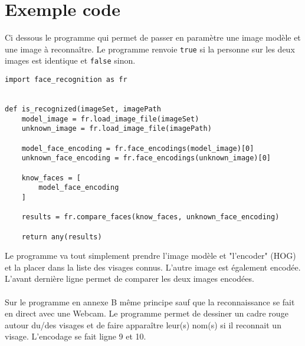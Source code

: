 \section{Exemple code}
Ci dessous le programme qui permet de passer en paramètre une image modèle et
une image à reconnaître. Le programme renvoie \verb|true| si la personne sur les deux
images est identique et \verb|false| sinon.
\\
\begin{verbatim}
import face_recognition as fr


def is_recognized(imageSet, imagePath
    model_image = fr.load_image_file(imageSet)
    unknown_image = fr.load_image_file(imagePath)

    model_face_encoding = fr.face_encodings(model_image)[0]
    unknown_face_encoding = fr.face_encodings(unknown_image)[0]

    know_faces = [
        model_face_encoding
    ]

    results = fr.compare_faces(know_faces, unknown_face_encoding)

    return any(results)
\end{verbatim}

Le programme va tout simplement prendre l'image modèle et "l'encoder" (HOG) et
la placer dans la liste des visages connus. L'autre image est également
encodée. L'avant dernière ligne permet de comparer les deux images encodées.
\\
\\
Sur le programme en annexe B même principe sauf que la reconnaissance se fait en direct
avec une Webcam. Le programme permet de dessiner un cadre rouge autour du/des
visages et de faire apparaître leur(s) nom(s) si il reconnait un visage.
L'encodage se fait ligne 9 et 10.
\newpage
